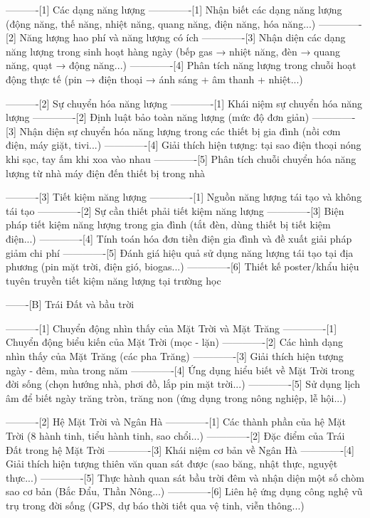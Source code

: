 ----------[1] Các dạng năng lượng
-------------[1] Nhận biết các dạng năng lượng (động năng, thế năng, nhiệt năng, quang năng, điện năng, hóa năng...)
-------------[2] Năng lượng hao phí và năng lượng có ích
-------------[3] Nhận diện các dạng năng lượng trong sinh hoạt hàng ngày (bếp gas → nhiệt năng, đèn → quang năng, quạt → động năng...)
-------------[4] Phân tích năng lượng trong chuỗi hoạt động thực tế (pin → điện thoại → ánh sáng + âm thanh + nhiệt...)

----------[2] Sự chuyển hóa năng lượng
-------------[1] Khái niệm sự chuyển hóa năng lượng
-------------[2] Định luật bảo toàn năng lượng (mức độ đơn giản)
-------------[3] Nhận diện sự chuyển hóa năng lượng trong các thiết bị gia đình (nồi cơm điện, máy giặt, tivi...)
-------------[4] Giải thích hiện tượng: tại sao điện thoại nóng khi sạc, tay ấm khi xoa vào nhau
-------------[5] Phân tích chuỗi chuyển hóa năng lượng từ nhà máy điện đến thiết bị trong nhà

----------[3] Tiết kiệm năng lượng
-------------[1] Nguồn năng lượng tái tạo và không tái tạo
-------------[2] Sự cần thiết phải tiết kiệm năng lượng
-------------[3] Biện pháp tiết kiệm năng lượng trong gia đình (tắt đèn, dùng thiết bị tiết kiệm điện...)
-------------[4] Tính toán hóa đơn tiền điện gia đình và đề xuất giải pháp giảm chi phí
-------------[5] Đánh giá hiệu quả sử dụng năng lượng tái tạo tại địa phương (pin mặt trời, điện gió, biogas...)
-------------[6] Thiết kế poster/khẩu hiệu tuyên truyền tiết kiệm năng lượng tại trường học

-------[B] Trái Đất và bầu trời

----------[1] Chuyển động nhìn thấy của Mặt Trời và Mặt Trăng
-------------[1] Chuyển động biểu kiến của Mặt Trời (mọc - lặn)
-------------[2] Các hình dạng nhìn thấy của Mặt Trăng (các pha Trăng)
-------------[3] Giải thích hiện tượng ngày - đêm, mùa trong năm
-------------[4] Ứng dụng hiểu biết về Mặt Trời trong đời sống (chọn hướng nhà, phơi đồ, lắp pin mặt trời...)
-------------[5] Sử dụng lịch âm để biết ngày trăng tròn, trăng non (ứng dụng trong nông nghiệp, lễ hội...)

----------[2] Hệ Mặt Trời và Ngân Hà
-------------[1] Các thành phần của hệ Mặt Trời (8 hành tinh, tiểu hành tinh, sao chổi...)
-------------[2] Đặc điểm của Trái Đất trong hệ Mặt Trời
-------------[3] Khái niệm cơ bản về Ngân Hà
-------------[4] Giải thích hiện tượng thiên văn quan sát được (sao băng, nhật thực, nguyệt thực...)
-------------[5] Thực hành quan sát bầu trời đêm và nhận diện một số chòm sao cơ bản (Bắc Đẩu, Thần Nông...)
-------------[6] Liên hệ ứng dụng công nghệ vũ trụ trong đời sống (GPS, dự báo thời tiết qua vệ tinh, viễn thông...)

